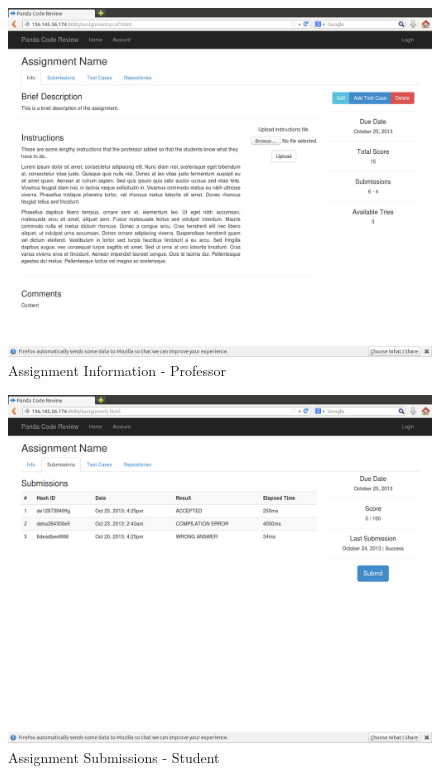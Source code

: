 \begin{figure}[H]
	\centering
	\includegraphics[width=\textwidth]{img/assignment-info-prof}
	\caption{Assignment Information - Professor}
\end{figure}

\begin{figure}[H]
	\centering
	\includegraphics[width=\textwidth]{img/assignment-sub}
	\caption{Assignment Submissions - Student}
\end{figure}

